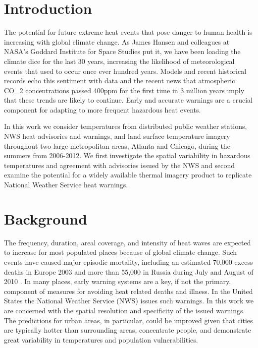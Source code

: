\documentclass{ametsoc}
\begin{document}
\section{Introduction}\label{section:intro}
The potential for future extreme heat events that pose danger to human health is increasing with global climate change. As James Hansen and colleagues at NASA's Goddard Institute for Space Studies put it, we have been loading the climate dice for the last 30 years, increasing the likelihood of meteorological events that used to occur once ever hundred years. Models and recent historical records echo this sentiment with data and the recent news that atmospheric CO\_{2} concentrations passed 400ppm for the first time in 3 million years imply that these trends are likely to continue.  Early and accurate warnings are a crucial component for adapting to more frequent hazardous heat events.

In this work we consider temperatures from distributed public weather stations, NWS heat advisories and warnings, and land surface temperature imagery throughout two large metropolitan areas, Atlanta and Chicago, during the summers from 2006-2012. We first investigate the spatial variability in hazardous temperatures and agreement with advisories issued by the NWS and second examine the potential for a widely available thermal imagery product to replicate National Weather Service heat warnings.

\section{Background} \label{section:background}
The frequency, duration, areal coverage, and intensity of heat waves are expected to increase for most populated places because of global climate change\citep{Meehl2004,Easterling2000}. Such events have caused major episodic mortality, including an estimated 70,000 excess deaths in Europe 2003 \citep{Robine2008} and more than 55,000 in Russia during July and August of 2010 \citep{Guha2011,Revich2011}. In many places, early warning systems are a key, if not the primary, component of measures for avoiding heat related deaths and illness. In the United States the National Weather Service (NWS) issues such warnings. In this work we are concerned with the spatial resolution and specificity of the issued warnings. The predictions for urban areas, in particular, could be improved given that cities are typically hotter than surrounding areas, concentrate people, and demonstrate great variability in temperatures and population vulnerabilities.
\end{document}
